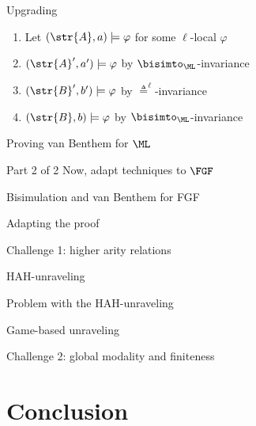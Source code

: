 \documentclass[169]{beamer}
\begin{document}
\begin{frame}[label=current]{Upgrading}
  \begin{center}
    
  \end{center}
  \vspace{1em}
  \begin{enumerate}
    \item Let $(\str{A}, a) \models \varphi$ for some $\ell$-local $\varphi$
    \item $(\str{A}', a') \models \varphi$ by $\bisimto_{\ML}$-invariance
    \item $(\str{B}', b') \models \varphi$ by $\triangleq^{\ell}$-invariance
    \item $(\str{B}, b) \models \varphi$ by $\bisimto_{\ML}$-invariance
  \end{enumerate}
\end{frame}

\begin{frame}[label=current]{Proving van Benthem for $\ML$}

\end{frame}

\begin{frame}{Part 2 of 2}
  Now, adapt techniques to $\FGF$
\end{frame}

\begin{frame}{Bisimulation and van Benthem for FGF}

\end{frame}

\begin{frame}{Adapting the proof}

\end{frame}

\begin{frame}{Challenge 1: higher arity relations}

\end{frame}

\begin{frame}{HAH-unraveling}

\end{frame}

\begin{frame}{Problem with the HAH-unraveling}

\end{frame}

\begin{frame}{Game-based unraveling}

\end{frame}

\begin{frame}{Challenge 2: global modality and finiteness}

\end{frame}

\section{Conclusion}
\end{document}
